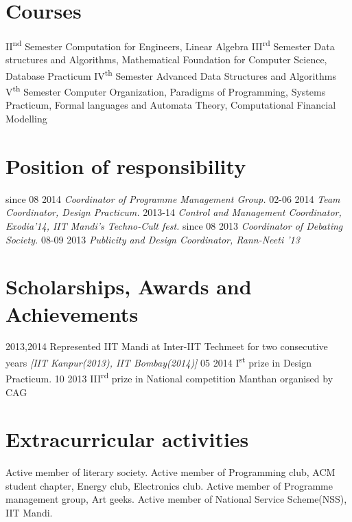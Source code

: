 \documentclass[]{friggeri-cv}
\begin{document}
\section{Courses}
\begin{entrylist}
  \courseentry
  	{II\textsuperscript{nd} Semester}
  	{Computation for Engineers, Linear Algebra}
  \courseentry
  	{III\textsuperscript{rd} Semester}
  	{Data structures and Algorithms, Mathematical Foundation for Computer Science, Database Practicum}
  \courseentry
  	{IV\textsuperscript{th} Semester}
  	{Advanced Data Structures and Algorithms}
  \courseentry
  	{V\textsuperscript{th} Semester}
  	{Computer Organization, Paradigms of Programming, Systems Practicum, Formal languages and Automata Theory, Computational Financial Modelling}
\end{entrylist}

\section{Position of responsibility}

\begin{entrylist}
  \responsibilityentry
  	{since 08 2014}
  	{\emph{Coordinator of Programme Management Group.}}
  \responsibilityentry
  	{02-06 2014}
  	{\emph{Team Coordinator, Design Practicum.}}
  \responsibilityentry
  	{2013-14}
  	{\emph{Control and Management Coordinator, Exodia’14, IIT Mandi’s Techno-Cult fest.}}
  \responsibilityentry
  	{since 08 2013}
  	{\emph{Coordinator of Debating Society.}}
  \responsibilityentry
  	{08-09 2013}
  	{\emph{Publicity and Design Coordinator, Rann-Neeti ’13}}
\end{entrylist}

\section{Scholarships, Awards and Achievements}

\begin{entrylist}
  \awardentry
   	{2013,2014}
   	{Represented IIT Mandi at Inter-IIT Techmeet for two consecutive years \emph{[IIT Kanpur(2013), IIT Bombay(2014)]}}
  \awardentry
  	{05 2014}
  	{I\textsuperscript{st} prize in Design Practicum.}
  \awardentry
  	{10 2013}
  	{III\textsuperscript{rd} prize in National competition Manthan organised by CAG}
\end{entrylist}

\section{Extracurricular activities}
\begin{entrylist}
  \responsibilityentry
  	{}
  	{Active member of literary society.}
  \responsibilityentry
  	{}
  	{Active member of Programming club, ACM student chapter, Energy club, Electronics club.}
  \responsibilityentry
  	{}
  	{Active member of Programme management group, Art geeks.}
  \responsibilityentry
  	{}
  	{Active member of National Service Scheme(NSS), IIT Mandi.}
\end{entrylist}
\end{document}
